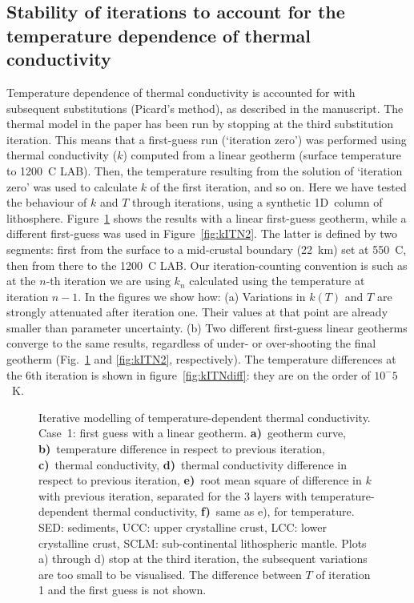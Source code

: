 {\begin{subappendices}
\subsection{Stability of iterations to account for the temperature dependence of thermal conductivity}
\label{ss:ApplSup:MethodTests:ItStab}

Temperature dependence of thermal conductivity is accounted for with subsequent substitutions (Picard's method), as described in the manuscript.
The thermal model in the paper has been run by stopping at the third substitution iteration.
This means that a first-guess run (`iteration zero') was performed using thermal conductivity ($k$) computed from a linear geotherm (surface temperature to 1200~\textdegree C LAB).
Then, the temperature resulting from the solution of `iteration zero' was used to calculate $k$ of the first iteration, and so on.
Here we have tested the behaviour of $k$ and $T$ through iterations, using a synthetic 1D~column of lithosphere.
Figure~\ref{fig:kITN1} shows the results with a linear first-guess geotherm, while a different first-guess was used in Figure~\ref{fig:kITN2}.
The latter is defined by two segments: first from the surface to a mid-crustal boundary (22~km) set at 550~\textdegree C, then from there to the 1200~\textdegree C LAB.
Our iteration-counting convention is such as at the $n$-th iteration we are using $k_n$ calculated using the temperature at iteration $n-1$.
In the figures we show how:
(a) Variations in $k(T)$ and $T$ are strongly attenuated after iteration one. Their values at that point are already smaller than parameter uncertainty.
(b) Two different first-guess linear geotherms converge to the same results, regardless of under- or over-shooting the final geotherm (Fig.~\ref{fig:kITN1} and \ref{fig:kITN2}, respectively). The temperature differences at the 6th iteration is shown in figure~\ref{fig:kITNdiff}: they are on the order of $10^-5$~K.

\begin{figure}
	\begin{adjustbox}{center}
	\end{adjustbox}
	\caption{Iterative modelling of temperature-dependent thermal conductivity. Case~1: first guess with a linear geotherm. \textbf{a)}~geotherm curve, \textbf{b)}~temperature difference in respect to previous iteration, \textbf{c)}~thermal conductivity, \textbf{d)}~thermal conductivity difference in respect to previous iteration, \textbf{e)}~root mean square of difference in $k$ with previous iteration, separated for the 3 layers with temperature-dependent thermal conductivity, \textbf{f)}~same as e), for temperature. SED: sediments, UCC: upper crystalline crust, LCC: lower crystalline crust, SCLM: sub-continental lithospheric mantle.
	Plots a) through d) stop at the third iteration, the subsequent variations are too small to be visualised. The difference between $T$ of iteration 1 and the first guess is not shown.}
	\label{fig:kITN1}
\end{figure}


\end{subappendices}}
